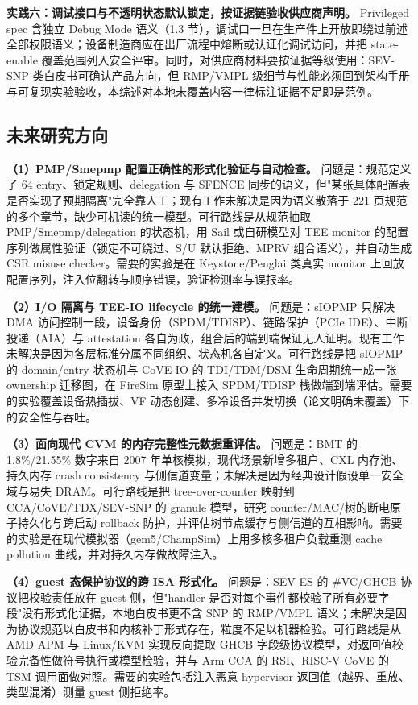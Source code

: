 \documentclass[11pt]{ctexart}
\begin{document}
\noindent\textbf{实践六：调试接口与不透明状态默认锁定，按证据链验收供应商声明。} Privileged spec 含独立 Debug Mode 语义（1.3 节），调试口一旦在生产件上开放即绕过前述全部权限语义\cite{riscv_privileged}；设备制造商应在出厂流程中熔断或认证化调试访问，并把 state-enable 覆盖范围列入安全评审。同时，对供应商材料要按证据等级使用：SEV-SNP 类白皮书可确认产品方向，但 RMP/VMPL 级细节与性能必须回到架构手册与可复现实验验收，本综述对本地未覆盖内容一律标注证据不足即是范例\cite{amd_sev_snp}。\par
\subsection{未来研究方向}
\noindent\textbf{（1）PMP/Smepmp 配置正确性的形式化验证与自动检查。} 问题是：规范定义了 64 entry、锁定规则、delegation 与 SFENCE 同步的语义，但"某张具体配置表是否实现了预期隔离"完全靠人工\cite{riscv_privileged}；现有工作未解决是因为语义散落于 221 页规范的多个章节，缺少可机读的统一模型。可行路线是从规范抽取 PMP/Smepmp/delegation 的状态机，用 Sail 或自研模型对 TEE monitor 的配置序列做属性验证（锁定不可绕过、S/U 默认拒绝、MPRV 组合语义），并自动生成 CSR misuse checker。需要的实验是在 Keystone/Penglai 类真实 monitor 上回放配置序列，注入位翻转与顺序错误，验证检测率与误报率。\par
\noindent\textbf{（2）I/O 隔离与 TEE-IO lifecycle 的统一建模。} 问题是：sIOPMP 只解决 DMA 访问控制一段，设备身份（SPDM/TDISP）、链路保护（PCIe IDE）、中断投递（AIA）与 attestation 各自为政，组合后的端到端保证无人证明\cite{feng2024siopmp}。现有工作未解决是因为各层标准分属不同组织、状态机各自定义。可行路线是把 sIOPMP 的 domain/entry 状态机与 CoVE-IO 的 TDI/TDM/DSM 生命周期统一成一张 ownership 迁移图，在 FireSim 原型上接入 SPDM/TDISP 栈做端到端评估。需要的实验覆盖设备热插拔、VF 动态创建、多冷设备并发切换（论文明确未覆盖）下的安全性与吞吐。\par
\noindent\textbf{（3）面向现代 CVM 的内存完整性元数据重评估。} 问题是：BMT 的 1.8\%/21.55\% 数字来自 2007 年单核模拟，现代场景新增多租户、CXL 内存池、持久内存 crash consistency 与侧信道变量\cite{rogers2007bonsai}；未解决是因为经典设计假设单一安全域与易失 DRAM。可行路线是把 tree-over-counter 映射到 CCA/CoVE/TDX/SEV-SNP 的 granule 模型，研究 counter/MAC/树的断电原子持久化与跨启动 rollback 防护，并评估树节点缓存与侧信道的互相影响。需要的实验是在现代模拟器（gem5/ChampSim）上用多核多租户负载重测 cache pollution 曲线，并对持久内存做故障注入。\par
\noindent\textbf{（4）guest 态保护协议的跨 ISA 形式化。} 问题是：SEV-ES 的 \#VC/GHCB 协议把校验责任放在 guest 侧，但"handler 是否对每个事件都校验了所有必要字段"没有形式化证据，本地白皮书更不含 SNP 的 RMP/VMPL 语义\cite{amd_sev_snp}；未解决是因为协议规范以白皮书和内核补丁形式存在，粒度不足以机器检验。可行路线是从 AMD APM 与 Linux/KVM 实现反向提取 GHCB 字段级协议模型，对返回值校验完备性做符号执行或模型检验，并与 Arm CCA 的 RSI、RISC-V CoVE 的 TSM 调用面做对照。需要的实验包括注入恶意 hypervisor 返回值（越界、重放、类型混淆）测量 guest 侧拒绝率。\par
\end{document}
